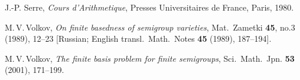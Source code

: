 \documentclass[11pt,reqno]{amsart}
\numberwithin{equation}{section}
\theoremstyle{remark}
\begin{document}
\begin{thebibliography}{99}
J.-P. Serre, \emph{Cours d'Arithmetique}, Presses Universitaires
de France, Paris, 1980.

M.\,V.\,Volkov, \emph{On finite basedness of semigroup varieties},
Mat.\  Zametki \textbf{ 45}, no.3 (1989),  12--23 [Russian;
English transl.\ Math.\ Notes \textbf{ 45} (1989), 187--194].

M.\,V.\,Volkov, \emph{The finite basis problem for finite
semigroups}, Sci.\ Math.\ Jpn. \textbf{53} (2001), 171--199.
\end{thebibliography}
\end{document}
